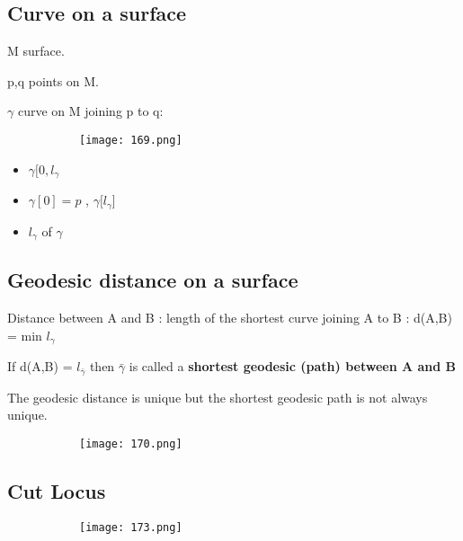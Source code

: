 \documentclass{article}
\begin{document}
\subsection{Curve on a surface}

M surface.

p,q points on M.

$\gamma$ curve on M joining p to q:

    \begin{figure}[ht!]
  \centering
  \begin{subfigure}[b]{0.4\linewidth}
    \texttt{[image: 169.png]}
  \end{subfigure}
\end{figure}


\begin{itemize}
    \item $\gamma [0,l_\gamma$ 
    \item $\gamma[0] = p$ , $\gamma[l_\gamma$]
    \item $l_\gamma $ of $\gamma$
\end{itemize}

\subsection{Geodesic distance on a surface}

Distance between A and B : length of the shortest curve joining A to B : d(A,B) = min $l_\gamma$

If d(A,B) = $l_{\bar \gamma}$ then $\bar \gamma$ is called a \textbf{shortest geodesic (path) between A and B}

The geodesic distance is unique but the shortest geodesic path is not always unique.

    \begin{figure}[ht!]
  \centering
  \begin{subfigure}[b]{0.4\linewidth}
    \texttt{[image: 170.png]}
  \end{subfigure}
\end{figure}

\subsection{Cut Locus}

    \begin{figure}[ht!]
  \centering
  \begin{subfigure}[b]{0.4\linewidth}
    \texttt{[image: 173.png]}
  \end{subfigure}
\end{figure}
\end{document}
